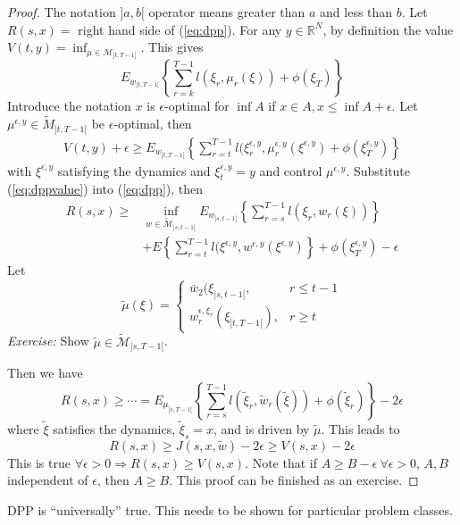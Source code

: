 \begin{proof}
The notation $]a,b[$ operator means greater than $a$ and less than $b$.
Let $R(s,x) = $ right hand side of (\ref{eq:dpp}).
For any $y\in\mathbb{R}^N$, by definition the value $V(t,y) = \inf_{\mu\in\mathcal{M}_{]t,T-1[}}$.%
This gives
$$E_{w_{]t,T-1[}}\left\lbrace \sum_{r=k}^{T-1}l(\xi_r,\mu_r(\xi))+\phi(\xi_T)\right\rbrace$$%
Introduce the notation $x$ is $\epsilon$-optimal for $\inf A$ if $x\in A, x\leq\inf A+\epsilon$.
Let $\mu^{\epsilon,y}\in\tilde{M}_{]t,T-1[}$ be $\epsilon$-optimal, then%
\begin{align}
\label{eq:dppvalue}
V(t,y) + \epsilon\geq E_{w_{]t,T-1[}}\left\lbrace \sum_{r=t}^{T-1}l(\xi_r^{\epsilon,y}, \mu_r^{\epsilon,y}(\xi^{\epsilon,y}) + \phi(\xi_T^{\epsilon,y})\right\rbrace%
\end{align}
with $\xi^{\epsilon,y}$ satisfying the dynamics and $\xi_t^{\epsilon,y} = y$ and control $\mu^{\epsilon,y}$.
Substitute (\ref{eq:dppvalue}) into (\ref{eq:dpp}), then
\begin{align*}
R(s,x) \geq &\inf_{w\in\tilde{\mathcal{M}}_{]s,t-1[}} E_{w_{]s,t-1[}}\left\lbrace \sum_{r=s}^{T-1}l(\xi_r,w_r(\xi))\right\rbrace \\%
&+ E\left\lbrace \sum_{r=t}^{T-1}l(\xi^{\epsilon,y},w^{\epsilon,y}(\xi^{\epsilon,y})\right\rbrace + \phi(\xi_T^{\epsilon,y}) - \epsilon
\end{align*}
Let
$$\tilde{\mu}(\xi) = \begin{cases} \bar{w}_2(\xi_{]s,t-1[}, & r\leq t-1 \\ w_r^{\epsilon,\xi_\tau}(\xi_{]t,T-1[}), & r\geq t \end{cases}$$%
\textit{Exercise:} Show $\tilde{\mu}\in\tilde{\mathcal{M}}_{]s,T-1[}$.%

Then we have
$$R(s,x) \geq \cdots = E_{\mu_{]s,T-1[}}\left\lbrace\sum_{r=s}^{T-1} l(\tilde{\xi}_r,\tilde{w}_r(\tilde{\xi})) + \phi(\tilde{\xi}_r)\right\rbrace - 2\epsilon$$%
where $\tilde{\xi}$ satisfies the dynamics, $\tilde{\xi}_s=x$, and is driven by $\tilde{\mu}$.
This leads to
$$R(s,x) \geq J(s,x,\tilde{w}) - 2\epsilon \geq V(s,x)-2\epsilon$$
This is true $\forall \epsilon>0\Rightarrow R(s,x)\geq V(s,x)$.
Note that if $A\geq B-\epsilon~\forall \epsilon > 0$, $A,B$ independent of $\epsilon$, then $A\geq B$.
This proof can be finished as an exercise.
\end{proof}

DPP is ``universally'' true.
This needs to be shown for particular problem classes.

